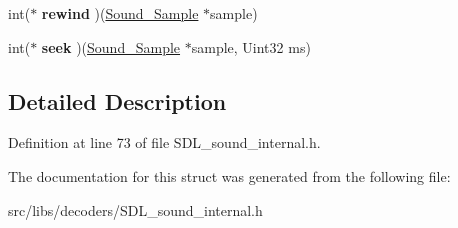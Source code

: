 \begin{DoxyCompactItemize}
\item 
\hypertarget{struct____SOUND__DECODERFUNCTIONS_____a366f6a583419c1e114df6c896eb5ae9f}{int($\ast$ {\bfseries rewind} )(\hyperlink{structSound__Sample}{Sound\-\_\-\-Sample} $\ast$sample)}\label{struct____SOUND__DECODERFUNCTIONS_____a366f6a583419c1e114df6c896eb5ae9f}

\item 
\hypertarget{struct____SOUND__DECODERFUNCTIONS_____a6d89b65b9536085f5236167e6baba4eb}{int($\ast$ {\bfseries seek} )(\hyperlink{structSound__Sample}{Sound\-\_\-\-Sample} $\ast$sample, Uint32 ms)}\label{struct____SOUND__DECODERFUNCTIONS_____a6d89b65b9536085f5236167e6baba4eb}

\end{DoxyCompactItemize}


\subsection{Detailed Description}


Definition at line 73 of file S\-D\-L\-\_\-sound\-\_\-internal.\-h.



The documentation for this struct was generated from the following file\-:\begin{DoxyCompactItemize}
\item 
src/libs/decoders/S\-D\-L\-\_\-sound\-\_\-internal.\-h\end{DoxyCompactItemize}
